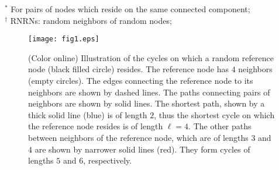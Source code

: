 \documentclass[preprint,pre,superscriptaddress,showpacs]{revtex4}
\begin{document}
\begin{table}
\label{table}
\end{table}
\noindent
$^{\ast}$ For pairs of nodes which reside on the same connected component; 
\\
\noindent
$^{\dag}$ RNRNs: random neighbors of random nodes;


\clearpage
\newpage


\begin{figure}
\texttt{[image: fig1.eps]}
\caption{
(Color online)
Illustration of the cycles on
which a random reference node (black filled circle) resides. The reference node
has $4$ neighbors (empty circles). 
The edges connecting the reference
node to its neighbors are shown by dashed lines. 
The paths connecting
pairs of neighbors are shown by solid lines.
The shortest path, shown by a thick solid line (blue) is of length $2$, 
thus the shortest cycle on which the reference node resides is of length $\ell=4$. 
The other paths between neighbors of the reference node, 
which are of lengths $3$ and $4$ are shown by narrower solid lines (red).
They form cycles of lengths $5$ and $6$, respectively.
}
\label{fig:1}
\end{figure}
\end{document}

